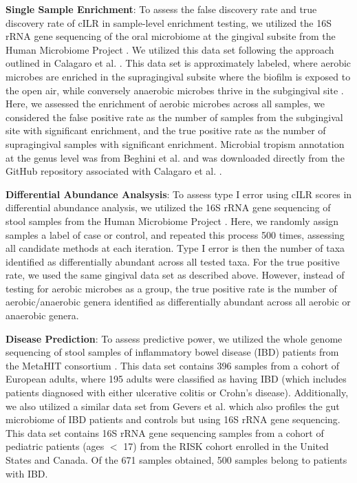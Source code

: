 \documentclass[10pt,letterpaper]{article}
\begin{document}
\noindent \textbf{Single Sample Enrichment}: To assess the false discovery rate and true discovery rate of cILR in sample-level enrichment testing, we utilized the 16S rRNA gene sequencing of the oral microbiome at the gingival subsite from the Human Microbiome Project \cite{consortium2012, proctor2019}. We utilized this data set following the approach outlined in Calagaro et al. \cite{calgaro2020}. This data set is approximately labeled, where aerobic microbes are enriched in the supragingival subsite where the biofilm is exposed to the open air, while conversely anaerobic microbes thrive in the subgingival site \cite{thurnheer2016}. Here, we assessed the enrichment of aerobic microbes across all samples, we considered the false positive rate as the number of samples from the subgingival site with significant enrichment, and the true positive rate as the number of supragingival samples with significant enrichment. Microbial tropism annotation at the genus level was from Beghini et al. \cite{beghini2019} and was downloaded directly from the GitHub repository associated with Calagaro et al. \cite{matteocalgaro2020}. 

\noindent \textbf{Differential Abundance Analsysis}: To assess type I error using cILR scores in differential abundance analysis, we utilized the 16S rRNA gene sequencing of stool samples from the Human Microbiome Project \cite{consortium2012, proctor2019}. Here, we randomly assign samples a label of case or control, and repeated this process 500 times, assessing all candidate methods at each iteration. Type I error is then the number of taxa identified as differentially abundant across all tested taxa. For the true positive rate, we used the same gingival data set as described above. However, instead of testing for aerobic microbes as a group, the true positive rate is the number of aerobic/anaerobic genera identified as differentially abundant across all aerobic or anaerobic genera. 

\noindent \textbf{Disease Prediction}: To assess predictive power, we utilized the whole genome sequencing of stool samples of inflammatory bowel disease (IBD) patients from the MetaHIT consortium \cite{nielsen2014}. This data set contains 396 samples from a cohort of European adults, where 195 adults were classified as having IBD (which includes patients diagnosed with either ulcerative colitis or Crohn's disease). Additionally, we also utilized a similar data set from Gevers et al. \cite{gevers2014} which also profiles the gut microbiome of IBD patients and controls but using 16S rRNA gene sequencing. This data set contains 16S rRNA gene sequencing samples from a cohort of pediatric patients (ages $<$ 17) from the RISK cohort enrolled in the United States and Canada. Of the 671 samples obtained, 500 samples belong to patients with IBD. 
\end{document}
